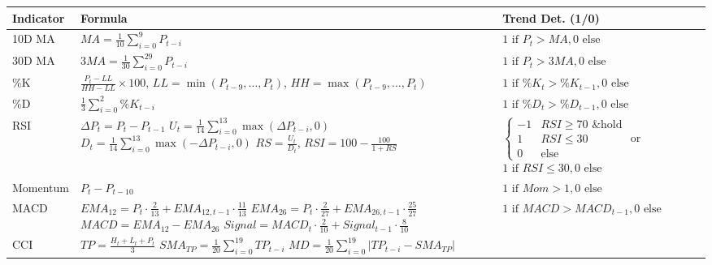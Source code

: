 \small
\begin{tabular}{|>{\raggedright\arraybackslash}m{2cm}|>{\raggedright\arraybackslash}m{10cm}|>{\raggedright\arraybackslash}m{5cm}|}
\hline
\textbf{Indicator} & \textbf{Formula} & \textbf{Trend Det. (1/0)} \\
\hline
10D MA & $MA = \frac{1}{10} \sum_{i=0}^{9} P_{t-i}$ & $1 \text{ if } P_t > MA, 0 \text{ else}$ \\
\hline
30D MA & $3MA = \frac{1}{30} \sum_{i=0}^{29} P_{t-i}$ & $1 \text{ if } P_t > 3MA, 0 \text{ else}$ \\
\hline
\%K & $\frac{P_t - LL}{HH - LL} \times 100$, $LL = \min(P_{t-9}, \ldots, P_t)$, $HH = \max(P_{t-9}, \ldots, P_t)$ & $1 \text{ if } \%K_t > \%K_{t-1}, 0 \text{ else}$ \\
\hline
\%D & $\frac{1}{3} \sum_{i=0}^{2} \%K_{t-i}$ & $1 \text{ if } \%D_t > \%D_{t-1}, 0 \text{ else}$ \\
\hline
RSI & $\Delta P_t = P_t - P_{t-1}$ \newline
$U_t = \frac{1}{14} \sum_{i=0}^{13} \max(\Delta P_{t-i}, 0)$ \newline
$D_t = \frac{1}{14} \sum_{i=0}^{13} \max(-\Delta P_{t-i}, 0)$ \newline
$RS = \frac{U_t}{D_t}$, $RSI = 100 - \frac{100}{1 + RS}$ & $\begin{cases}
-1 & RSI \geq 70 \text{ \& hold} \\
1 & RSI \leq 30 \\
0 & \text{else}
\end{cases}$ \newline
or \newline
$1 \text{ if } RSI \leq 30, 0 \text{ else}$ \\
\hline
Momentum & $P_t - P_{t-10}$ & $1 \text{ if } Mom > 1, 0 \text{ else}$ \\
\hline
MACD & $EMA_{12} = P_t \cdot \frac{2}{13} + EMA_{12,t-1} \cdot \frac{11}{13}$ \newline
$EMA_{26} = P_t \cdot \frac{2}{27} + EMA_{26,t-1} \cdot \frac{25}{27}$ \newline
$MACD = EMA_{12} - EMA_{26}$ \newline
$Signal = MACD_t \cdot \frac{2}{10} + Signal_{t-1} \cdot \frac{8}{10}$ & $1 \text{ if } MACD > MACD_{t-1}, 0 \text{ else}$ \\
\hline
CCI & $TP = \frac{H_t + L_t + P_t}{3}$ \newline
$SMA_{TP} = \frac{1}{20} \sum_{i=0}^{19} TP_{t-i}$ \newline
$MD = \frac{1}{20} \sum_{i=0}^{19} |TP_{t-i} - SMA_{TP}|$ \newline

\end{tabular}
